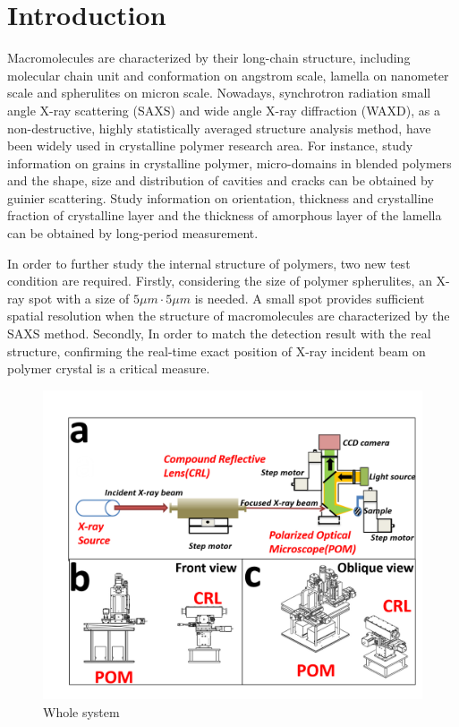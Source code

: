 \documentclass{Head}
\begin{document}
\tableofcontents
\linenumbers
\section{Introduction}
Macromolecules are characterized by their long-chain structure, including molecular chain unit and conformation on angstrom scale, lamella on nanometer scale and spherulites on micron scale.
Nowadays, synchrotron radiation small angle X-ray scattering (SAXS) and wide angle X-ray diffraction (WAXD), as a non-destructive, highly statistically averaged structure analysis method, have been widely used in crystalline polymer research area.
For instance, study information on grains in crystalline polymer, micro-domains in blended polymers and the shape, size and distribution of cavities and cracks can be obtained by guinier scattering.
Study information on orientation, thickness and crystalline fraction of crystalline layer and the thickness of amorphous layer of the lamella can be obtained by long-period measurement.


In order to further study the internal structure of polymers, two new test condition are required.
Firstly, considering the size of polymer spherulites, an X-ray spot with a size of $5\mu m \cdot 5\mu m$ is needed.
A small spot provides sufficient spatial resolution when the structure of macromolecules are characterized by the SAXS method.
Secondly, In order to match the detection result with the real structure, confirming the real-time exact position of X-ray incident beam on polymer crystal is a critical measure.
\begin{figure}
    \centering
    \includegraphics[scale=0.5]{Figures/Fig1WholeSystem.png}
    \caption{Whole system}
    \label{WholeSystem}
\end{figure}
\end{document}
